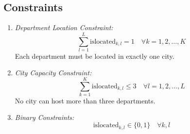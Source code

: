 \documentclass{article}
\begin{document}
\subsection*{Constraints}
\begin{enumerate}
    \item \textit{Department Location Constraint:}
    \[
    \sum_{l=1}^L \text{islocated}_{k, l} = 1 \quad \forall k = 1, 2, \ldots, K
    \]
    Each department must be located in exactly one city.

    \item \textit{City Capacity Constraint:}
    \[
    \sum_{k=1}^K \text{islocated}_{k, l} \leq 3 \quad \forall l = 1, 2, \ldots, L
    \]
    No city can host more than three departments.

    \item \textit{Binary Constraints:}
    \[
    \text{islocated}_{k, l} \in \{0, 1\} \quad \forall k, l
    \]
\end{enumerate}
\end{document}
